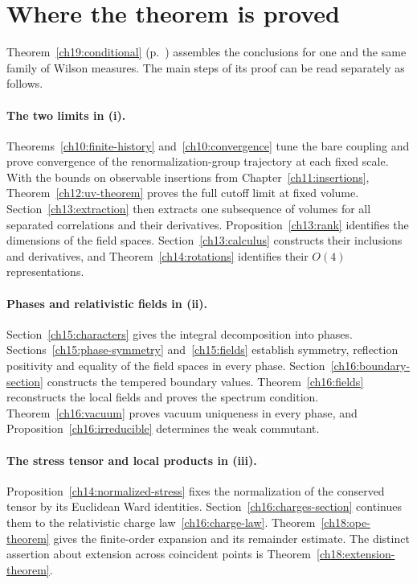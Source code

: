\clearpage
\section*{Where the theorem is proved}

Theorem~\ref{ch19:conditional} (p.~\pageref{ch19:conditional}) assembles
the conclusions for one and the same family of Wilson measures. The main
steps of its proof can be read separately as follows.

\paragraph{The two limits in (i).}
Theorems~\ref{ch10:finite-history} and~\ref{ch10:convergence} tune the
bare coupling and prove convergence of the renormalization-group trajectory
at each fixed scale. With the bounds on observable insertions from
Chapter~\ref{ch11:insertions}, Theorem~\ref{ch12:uv-theorem} proves the
full cutoff limit at fixed volume. Section~\ref{ch13:extraction} then
extracts one subsequence of volumes for all separated correlations and
their derivatives. Proposition~\ref{ch13:rank} identifies the dimensions
of the field spaces. Section~\ref{ch13:calculus} constructs their inclusions
and derivatives, and Theorem~\ref{ch14:rotations} identifies their $O(4)$
representations.

\paragraph{Phases and relativistic fields in (ii).}
Section~\ref{ch15:characters} gives the integral decomposition into phases.
Sections~\ref{ch15:phase-symmetry} and~\ref{ch15:fields} establish symmetry,
reflection positivity and equality of the field spaces in every phase.
Section~\ref{ch16:boundary-section} constructs the tempered boundary
values. Theorem~\ref{ch16:fields} reconstructs the local fields and proves
the spectrum condition. Theorem~\ref{ch16:vacuum} proves vacuum uniqueness
in every phase, and Proposition~\ref{ch16:irreducible} determines the
weak commutant.

\paragraph{The stress tensor and local products in (iii).}
Proposition~\ref{ch14:normalized-stress} fixes the normalization of the
conserved tensor by its Euclidean Ward identities. Section~\ref{ch16:charges-section}
continues them to the relativistic charge law~\eqref{ch16:charge-law}.
Theorem~\ref{ch18:ope-theorem} gives the finite-order expansion and its
remainder estimate. The distinct assertion about extension across
coincident points is Theorem~\ref{ch18:extension-theorem}.

